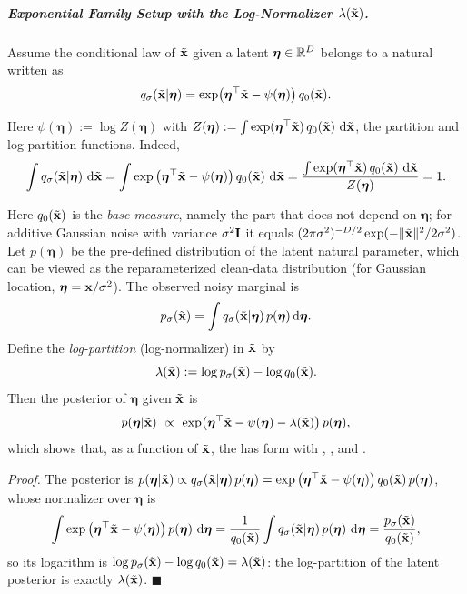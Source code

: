 \subparagraph{Exponential Family Setup with the Log-Normalizer $\lambda(\tilde{{\mathbf{x}}})$.}
Assume the conditional law of $\tilde{{\mathbf{x}}}$ given a latent  $\boldsymbol\eta\in\mathbb{R}^D$ belongs to a natural  written as
\[
q_\sigma(\tilde{{\mathbf{x}}}|\boldsymbol\eta)
=\exp\!\big(\boldsymbol\eta^\top \tilde{{\mathbf{x}}}-\psi(\boldsymbol\eta)\big)\,q_0(\tilde{{\mathbf{x}}}).
\]
\begin{nknote}
\noindent Here $\psi(\boldsymbol\eta) := \log Z(\boldsymbol\eta)$ with $Z(\boldsymbol\eta) := \int \exp(\boldsymbol\eta^\top\tilde{{\mathbf{x}}})\,q_0(\tilde{{\mathbf{x}}})\,\mathop{}\!\mathrm{d}\tilde{{\mathbf{x}}}$, the partition and log-partition functions. Indeed,
\[
\int q_\sigma(\tilde{{\mathbf{x}}}|\boldsymbol\eta)\,\mathop{}\!\mathrm{d}\tilde{{\mathbf{x}}}
= \int \exp\big(\boldsymbol\eta^\top\tilde{{\mathbf{x}}} - \psi(\boldsymbol\eta)\big)\,q_0(\tilde{{\mathbf{x}}})\,\mathop{}\!\mathrm{d}\tilde{{\mathbf{x}}}
= \frac{\int \exp(\boldsymbol\eta^\top\tilde{{\mathbf{x}}})\,q_0(\tilde{{\mathbf{x}}})\,\mathop{}\!\mathrm{d}\tilde{{\mathbf{x}}}}{Z(\boldsymbol\eta)}
= 1.
\]
\end{nknote}
Here $q_0(\tilde{{\mathbf{x}}})$ is the \emph{base measure}, namely the part that does not depend on $\boldsymbol\eta$; for additive Gaussian noise with variance $\sigma^2{\mathbf{I}}$ it equals $(2\pi\sigma^2)^{-D/2}\exp(-\|\tilde{{\mathbf{x}}}\|^2/2\sigma^2)$.
Let $p(\boldsymbol\eta)$ be the pre-defined distribution of the latent natural parameter, which can be viewed as the reparameterized clean-data distribution (for Gaussian location, $\boldsymbol\eta={\mathbf{x}}/\sigma^2$).
The observed noisy marginal is
\[
p_\sigma(\tilde{{\mathbf{x}}})=\int q_\sigma(\tilde{{\mathbf{x}}}|\boldsymbol\eta)\,p(\boldsymbol\eta)\mathop{}\!\mathrm{d}\boldsymbol\eta.
\]
Define the \emph{log-partition} (log-normalizer) in $\tilde{{\mathbf{x}}}$ by
\[
\lambda(\tilde{{\mathbf{x}}}) := \log p_\sigma(\tilde{{\mathbf{x}}})-\log q_0(\tilde{{\mathbf{x}}}).
\]
Then the posterior of $\boldsymbol\eta$ given $\tilde{{\mathbf{x}}}$ is
\[
p(\boldsymbol\eta|\tilde{{\mathbf{x}}})
\ \propto\
\exp\!\big(\boldsymbol\eta^\top \tilde{{\mathbf{x}}}-\psi(\boldsymbol\eta)-\lambda(\tilde{{\mathbf{x}}})\big)\,p(\boldsymbol\eta),
\]
which shows that, as a function of $\tilde{{\mathbf{x}}}$, the  has  form with , , and .
\begin{nknote}
\noindent\textit{Proof.} The posterior is $p(\boldsymbol\eta|\tilde{{\mathbf{x}}}) \propto q_\sigma(\tilde{{\mathbf{x}}}|\boldsymbol\eta)\,p(\boldsymbol\eta) = \exp\big(\boldsymbol\eta^\top\tilde{{\mathbf{x}}} - \psi(\boldsymbol\eta)\big)\,q_0(\tilde{{\mathbf{x}}})\,p(\boldsymbol\eta)$, whose normalizer over $\boldsymbol\eta$ is
\[
\int \exp\big(\boldsymbol\eta^\top\tilde{{\mathbf{x}}} - \psi(\boldsymbol\eta)\big)\,p(\boldsymbol\eta)\,\mathop{}\!\mathrm{d}\boldsymbol\eta
= \frac{1}{q_0(\tilde{{\mathbf{x}}})}\int q_\sigma(\tilde{{\mathbf{x}}}|\boldsymbol\eta)\,p(\boldsymbol\eta)\,\mathop{}\!\mathrm{d}\boldsymbol\eta
= \frac{p_\sigma(\tilde{{\mathbf{x}}})}{q_0(\tilde{{\mathbf{x}}})},
\]
so its logarithm is $\log p_\sigma(\tilde{{\mathbf{x}}}) - \log q_0(\tilde{{\mathbf{x}}}) = \lambda(\tilde{{\mathbf{x}}})$: the log-partition of the latent posterior is exactly $\lambda(\tilde{{\mathbf{x}}})$. \hfill$\blacksquare$
\end{nknote}

